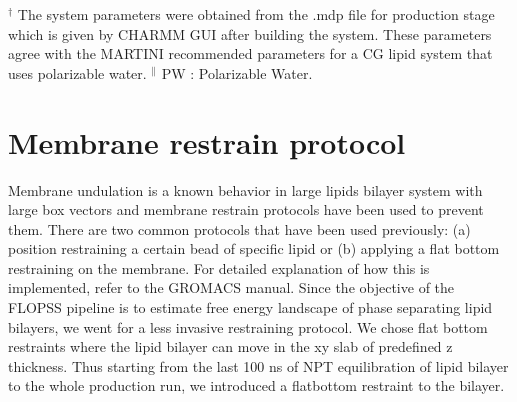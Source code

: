 \documentclass[10pt]{article}
\let\oldsection\section
\renewcommand{\section}{\clearpage\oldsection}
\begin{document}
$^\dagger$ The system parameters were obtained from the .mdp file for production stage which is given by CHARMM GUI\cite{Qi2015}
after building the system. These parameters agree with the MARTINI recommended parameters\cite{DeJong2016} for a CG lipid system that uses polarizable water\cite{Yesylevskyy2010}.
$^{\parallel}$ PW : Polarizable Water.

\section{Membrane restrain protocol}

Membrane undulation is a known behavior in large lipids bilayer system with large box vectors and membrane restrain protocols have been used to prevent them\cite{Ingolfsson2014,Lin2019,Su2020}.
There are two common protocols that have been used previously: (a) position restraining a certain bead of specific lipid or
(b) applying a flat bottom restraining on the membrane.
For detailed explanation of how this is implemented, refer to the GROMACS manual\cite{GromacsManual}.
Since the objective of the FLOPSS pipeline is to estimate free energy landscape of phase separating lipid bilayers,
we went for a less invasive restraining protocol.
We chose flat bottom restraints where the lipid bilayer can move in the xy slab of predefined z thickness.
Thus starting from the last 100 ns of NPT equilibration of lipid bilayer to the whole production run,
we introduced a flatbottom restraint to the bilayer.\\
\end{document}
